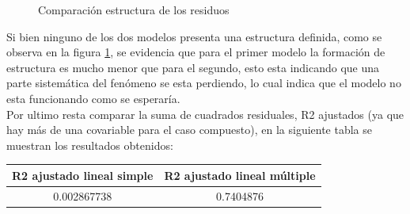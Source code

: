 \begin{figure}[h]
\centering
{}%
\hspace{0.25cm}%
\caption{Comparación estructura de los residuos}
\label{estructura_comparativa}
\end{figure}


Si bien ninguno de los dos modelos presenta una estructura definida, como se observa en la figura \ref{estructura_comparativa}, se evidencia que para el primer modelo la formación de estructura es mucho menor que para el segundo, esto esta indicando que una parte sistemática del fenómeno se esta perdiendo, lo cual indica que el modelo no esta funcionando como se esperaría.\\


Por ultimo resta comparar la suma de cuadrados residuales, R2 ajustados (ya que hay más de una covariable para el caso compuesto), en la siguiente tabla se muestran los resultados obtenidos:\\


\begin{center}
 \begin{tabular}{||c c||} 
 \hline
    R2 ajustado lineal simple & R2 ajustado lineal múltiple \\ 
 \hline
 0.002867738 & 0.7404876 \\
 \hline
 \hline
\end{tabular}
\end{center}

